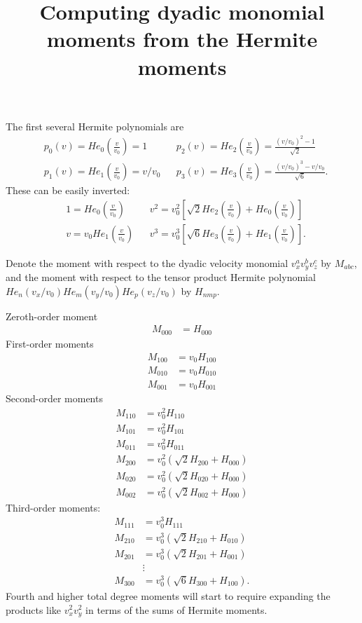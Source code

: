 \documentclass{article}
\title{Computing dyadic monomial moments from the Hermite moments}
\begin{document}
\maketitle

The first several Hermite polynomials are
\begin{align*}
&p_0(v) = He_0 \left( \frac{v}{v_0} \right) = 1 
&&p_2(v) = He_2 \left( \frac{v}{v_0} \right) = \frac{(v/v_0)^2 - 1}{\sqrt{2}} \\
&p_1(v) = He_1 \left( \frac{v}{v_0} \right) = v/v_0
&&p_3(v) = He_3 \left( \frac{v}{v_0} \right) = \frac{(v/v_0)^3 - v/v_0}{\sqrt{6}}.
\end{align*}
These can be easily inverted:
\begin{align*}
&1 = He_0 \left( \frac{v}{v_0} \right)
&&v^2 = v_0^2 \left[ \sqrt{2} He_2 \left( \frac{v}{v_0} \right) + He_0 \left( \frac{v}{v_0} \right)  \right] \\
&v = v_0 He_1 \left( \frac{v}{v_0} \right)
&&v^3 = v_0^3 \left[ \sqrt{6} He_3 \left( \frac{v}{v_0} \right) + He_1 \left( \frac{v}{v_0} \right)  \right].
\end{align*}

Denote the moment with respect to the dyadic velocity monomial $v_x^a v_y^b v_z^c$ by $M_{abc}$,
and the moment with respect to the tensor product Hermite polynomial $He_n(v_x/v_0) He_m(v_y/v_0) He_p(v_z/v_0)$ by $H_{nmp}$.

Zeroth-order moment
\begin{align*}
    M_{000} &= H_{000}
\end{align*}
First-order moments
\begin{align*}
    M_{100} &= v_0 H_{100} \\
    M_{010} &= v_0 H_{010} \\
    M_{001} &= v_0 H_{001}
\end{align*}
Second-order moments
\begin{align*}
    M_{110} &= v_0^2 H_{110} \\
    M_{101} &= v_0^2 H_{101} \\
    M_{011} &= v_0^2 H_{011} \\
    M_{200} &= v_0^2 (\sqrt{2} H_{200} + H_{000}) \\
    M_{020} &= v_0^2 (\sqrt{2} H_{020} + H_{000}) \\
    M_{002} &= v_0^2 (\sqrt{2} H_{002} + H_{000})
\end{align*}
Third-order moments:
\begin{align*}
    M_{111} &= v_0^3 H_{111} \\
    M_{210} &= v_0^3 (\sqrt{2} H_{210} + H_{010}) \\
    M_{201} &= v_0^3 (\sqrt{2} H_{201} + H_{001}) \\
            &\vdots \\
    M_{300} &= v_0^3 (\sqrt{6} H_{300} + H_{100}).
\end{align*}
Fourth and higher total degree moments will start to require expanding the products like $v_x^2 v_y^2$
in terms of the sums of Hermite moments.
\end{document}
